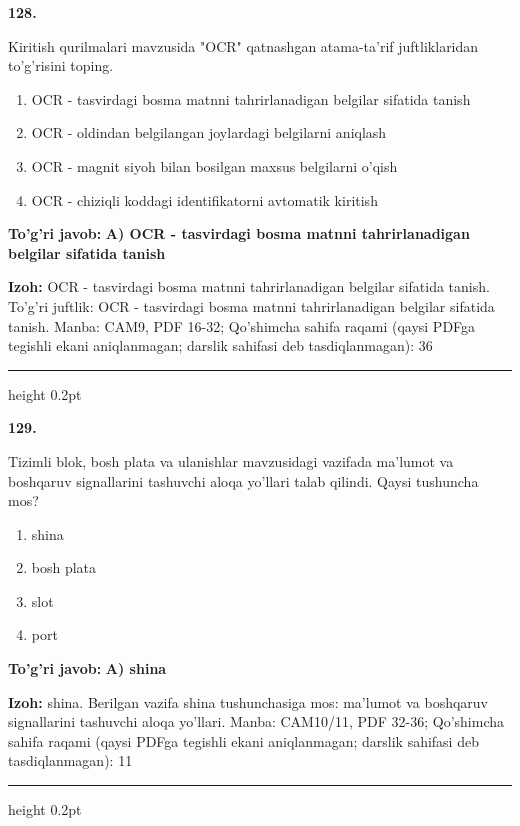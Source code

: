 \documentclass[10pt,a4paper]{article}
\begin{document}
{\bfseries\sffamily\color{ink} 128.}
\par
Kiritish qurilmalari mavzusida "OCR" qatnashgan atama-ta'rif juftliklaridan to'g'risini toping.
\begin{enumerate}[label=\Alph*),leftmargin=9mm]
\item OCR - tasvirdagi bosma matnni tahrirlanadigan belgilar sifatida tanish
\item OCR - oldindan belgilangan joylardagi belgilarni aniqlash
\item OCR - magnit siyoh bilan bosilgan maxsus belgilarni o'qish
\item OCR - chiziqli koddagi identifikatorni avtomatik kiritish
\end{enumerate}
\begin{tcolorbox}[enhanced,breakable,colback=teal!4,colframe=teal!60!black,boxrule=0.45pt,arc=1.2mm,left=2.7mm,right=2.7mm,top=1.8mm,bottom=1.8mm,before skip=2mm,after skip=2mm]
{\bfseries\sffamily\color{teal}To'g'ri javob:} \textbf{A) OCR - tasvirdagi bosma matnni tahrirlanadigan belgilar sifatida tanish}
\par\smallskip
{\bfseries Izoh:} OCR - tasvirdagi bosma matnni tahrirlanadigan belgilar sifatida tanish. To'g'ri juftlik: OCR - tasvirdagi bosma matnni tahrirlanadigan belgilar sifatida tanish. Manba: CAM9, PDF 16-32; Qo'shimcha sahifa raqami (qaysi PDFga tegishli ekani aniqlanmagan; darslik sahifasi deb tasdiqlanmagan): 36
\end{tcolorbox}
\vspace{2mm}\hrule height 0.2pt\vspace{3mm}

{\bfseries\sffamily\color{ink} 129.}
\par
Tizimli blok, bosh plata va ulanishlar mavzusidagi vazifada ma'lumot va boshqaruv signallarini tashuvchi aloqa yo'llari talab qilindi. Qaysi tushuncha mos?
\begin{enumerate}[label=\Alph*),leftmargin=9mm]
\item shina
\item bosh plata
\item slot
\item port
\end{enumerate}
\begin{tcolorbox}[enhanced,breakable,colback=teal!4,colframe=teal!60!black,boxrule=0.45pt,arc=1.2mm,left=2.7mm,right=2.7mm,top=1.8mm,bottom=1.8mm,before skip=2mm,after skip=2mm]
{\bfseries\sffamily\color{teal}To'g'ri javob:} \textbf{A) shina}
\par\smallskip
{\bfseries Izoh:} shina. Berilgan vazifa shina tushunchasiga mos: ma'lumot va boshqaruv signallarini tashuvchi aloqa yo'llari. Manba: CAM10/11, PDF 32-36; Qo'shimcha sahifa raqami (qaysi PDFga tegishli ekani aniqlanmagan; darslik sahifasi deb tasdiqlanmagan): 11
\end{tcolorbox}
\vspace{2mm}\hrule height 0.2pt\vspace{3mm}
\end{document}
